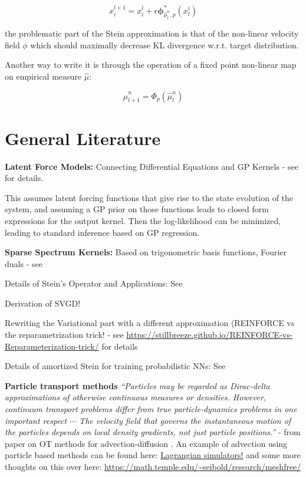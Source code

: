 \documentclass[12pt]{article}
\renewcommand{\[}{\left[}
\renewcommand{\]}{\right]}
\renewcommand{\(}{\left(}
\renewcommand{\)}{\right)}
\begin{document}

\begin{equation*}
    x_i^{l+1} = x_i^{l} + \epsilon \mathbf{\phi}_{\hat{\mu}_l^n, p}^{\ast}(x_l^i)
\end{equation*}

the problematic part of the Stein approximation is that of the non-linear velocity field $\phi$ which should maximally decrease KL divergence w.r.t. target distribution. 

Another way to write it is through the operation of a fixed point non-linear map on empirical measure $\hat{\mu}$:

$$\hat{\mu}_{l + 1}^n = \Phi_p (\hat{\mu}_l^n)$$




\section{General Literature}

\noindent \textbf{Latent Force Models:} Connecting Differential Equations and GP Kernels - see \cite{alvarez09a} for details.

\noindent This assumes latent forcing functions that give rise to the state evolution of the system, and assuming a GP prior on those functions leads to closed form expressions for the output kernel. Then the log-likelihood can be minimized, leading to standard inference based on GP regression.

\noindent \textbf{Sparse Spectrum Kernels:} Based on trigonometric basis functions, Fourier duals - see \cite{lazaro-gredilla_sparse_2010}

Details of Stein's Operator and Applications: See \cite{anastasiou_steins_2023}

\noindent Derivation of SVGD!


\noindent Rewriting the Variational part with a different approximation (\textsc{REINFORCE} vs the reparametrization trick! - see \url{https://stillbreeze.github.io/REINFORCE-vs-Reparameterization-trick/} for details


\noindent Details of amortized Stein for training probabilistic NNs: See \cite{feng_learning_2017}


\noindent \textbf{Particle transport methods} \emph{``Particles may be regarded as Dirac-delta approximations of otherwise continuous measures or densities. However, continuum transport problems differ from true particle-dynamics problems in one important respect $\cdots$ The velocity field that governs the instantaneous motion of the particles depends on local density gradients, not just particle positions.''} - from paper on OT methods for advection-diffusion \cite{fedeli_geometrically-exact_2017}. An example of advection using particle based methods can be found here: \href{https://docs.oceanparcels.org/en/latest/examples/tutorial_analyticaladvection.html}{Lagrangian simulators!} and some more thoughts on this over here: \url{https://math.temple.edu/~seibold/research/meshfree/}
\end{document}
